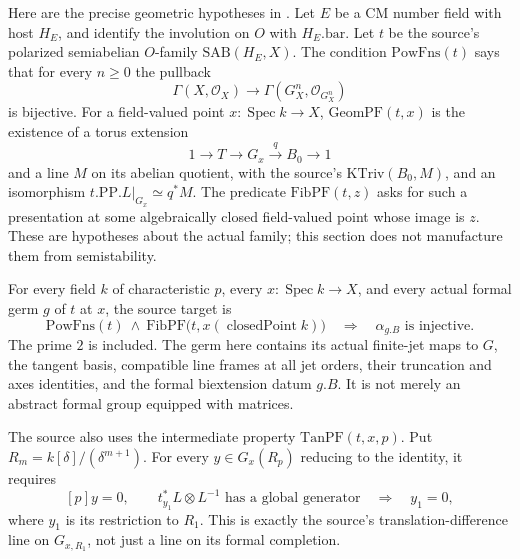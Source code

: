 Here are the precise geometric hypotheses in
.
Let \(E\) be a CM number field with host \(H_E\), and identify
the involution on \(O\) with \(H_E.\mathrm{bar}\).
Let \(t\) be the source's polarized semiabelian \(O\)-family
\(\mathrm{SAB}(H_E,X)\).
The condition \(\mathrm{PowFns}(t)\) says that for every
\(n\ge0\) the pullback
\[
       \Gamma(X,\mathcal O_X)\longrightarrow
                  \Gamma(G^n_X,\mathcal O_{G^n_X})
\]
is bijective.
For a field-valued point \(x:\operatorname{Spec}k\to X\),
\(\mathrm{GeomPF}(t,x)\) is the existence of a torus extension
\[
          1\longrightarrow T\longrightarrow G_x
                     \stackrel q\longrightarrow B_0\longrightarrow1
\]
and a line \(M\) on its abelian quotient, with the source's
\(\mathrm{KTriv}(B_0,M)\), and an isomorphism
\(t.\mathrm{PP}.L|_{G_x}\simeq q^*M\).
The predicate \(\mathrm{FibPF}(t,z)\) asks for such a
presentation at some algebraically closed field-valued
point whose image is \(z\).
These are hypotheses about the actual family; this
section does not manufacture them from semistability.

For every field \(k\) of characteristic \(p\), every
\(x:\operatorname{Spec}k\to X\), and every actual formal
germ \(g\) of \(t\) at \(x\), the source target is
\[
 \mathrm{PowFns}(t)\ \land\
 \mathrm{FibPF}\bigl(t,x(\operatorname{closedPoint}k)\bigr)
                  \quad\Longrightarrow\quad
                         \alpha_{g.B}\text{ is injective}.
 \tag{FC3}\label{eq:faithful-fibre-inj-target}
\]
The prime \(2\) is included.
The germ here contains its actual finite-jet maps to \(G\),
the tangent basis, compatible line frames at all jet orders,
their truncation and axes identities, and the formal
biextension datum \(g.B\).  It is not merely an abstract
formal group equipped with matrices.

The source also uses the intermediate property
\(\mathrm{TanPF}(t,x,p)\).
Put \(R_m=k[\delta]/(\delta^{m+1})\).
For every \(y\in G_x(R_p)\) reducing to the identity,
it requires
\[
 [p]y=0,\qquad
 t_{y_1}^*L\otimes L^{-1}\text{ has a global generator}
                   \quad\Longrightarrow\quad y_1=0,
 \tag{FC4}\label{eq:faithful-tanpf}
\]
where \(y_1\) is its restriction to \(R_1\).
This is exactly the source's translation-difference line
on \(G_{x,R_1}\), not just a line on its formal completion.

